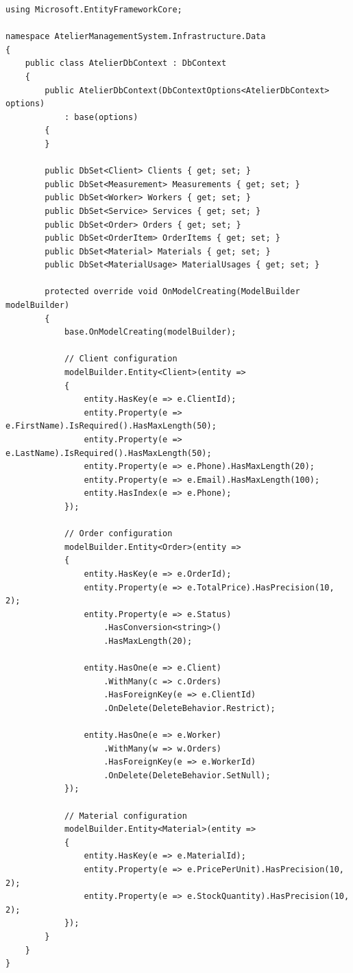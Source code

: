 \documentclass[14pt,a4paper]{extarticle}
\begin{document}
\begin{lstlisting}[language={[Sharp]C}, caption=DbContext для системи ательє, basicstyle=\small\ttfamily, breaklines=true, frame=single]
using Microsoft.EntityFrameworkCore;

namespace AtelierManagementSystem.Infrastructure.Data
{
    public class AtelierDbContext : DbContext
    {
        public AtelierDbContext(DbContextOptions<AtelierDbContext> options)
            : base(options)
        {
        }
        
        public DbSet<Client> Clients { get; set; }
        public DbSet<Measurement> Measurements { get; set; }
        public DbSet<Worker> Workers { get; set; }
        public DbSet<Service> Services { get; set; }
        public DbSet<Order> Orders { get; set; }
        public DbSet<OrderItem> OrderItems { get; set; }
        public DbSet<Material> Materials { get; set; }
        public DbSet<MaterialUsage> MaterialUsages { get; set; }
        
        protected override void OnModelCreating(ModelBuilder modelBuilder)
        {
            base.OnModelCreating(modelBuilder);
            
            // Client configuration
            modelBuilder.Entity<Client>(entity =>
            {
                entity.HasKey(e => e.ClientId);
                entity.Property(e => e.FirstName).IsRequired().HasMaxLength(50);
                entity.Property(e => e.LastName).IsRequired().HasMaxLength(50);
                entity.Property(e => e.Phone).HasMaxLength(20);
                entity.Property(e => e.Email).HasMaxLength(100);
                entity.HasIndex(e => e.Phone);
            });
            
            // Order configuration
            modelBuilder.Entity<Order>(entity =>
            {
                entity.HasKey(e => e.OrderId);
                entity.Property(e => e.TotalPrice).HasPrecision(10, 2);
                entity.Property(e => e.Status)
                    .HasConversion<string>()
                    .HasMaxLength(20);
                    
                entity.HasOne(e => e.Client)
                    .WithMany(c => c.Orders)
                    .HasForeignKey(e => e.ClientId)
                    .OnDelete(DeleteBehavior.Restrict);
                    
                entity.HasOne(e => e.Worker)
                    .WithMany(w => w.Orders)
                    .HasForeignKey(e => e.WorkerId)
                    .OnDelete(DeleteBehavior.SetNull);
            });
            
            // Material configuration
            modelBuilder.Entity<Material>(entity =>
            {
                entity.HasKey(e => e.MaterialId);
                entity.Property(e => e.PricePerUnit).HasPrecision(10, 2);
                entity.Property(e => e.StockQuantity).HasPrecision(10, 2);
            });
        }
    }
}
\end{lstlisting}
\end{document}
